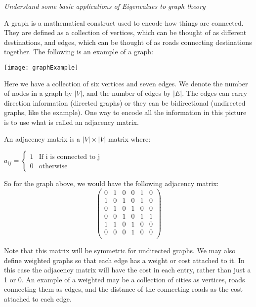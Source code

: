 \documentclass{newsiambook}
\newcommand{\objective}[1]{\vspace{5mm}{\bf Lesson Objective: } \emph{#1} \setcounter{problem}{0} \setcounter{equation}{0} \vspace{5mm}}
\begin{document}
\objective{Understand some basic applications of Eigenvalues to graph theory}

A graph is a mathematical construct used to encode how things are connected.  They are defined as a collection of vertices, which can be thought of as different destinations, and edges, which can be thought of as roads connecting destinations together.  The following is an example of a graph:

\begin{center}
\texttt{[image: graphExample]}
\end{center}

Here we have a collection of six vertices and seven edges.  We denote the number of nodes in a graph by $|V|$, and the number of edges by $|E|$.  The edges can carry direction information (directed graphs) or they can be bidirectional (undirected graphs, like the example).  One way to encode all the information in this picture is to use what is called an adjacency matrix.

\begin{definition} An adjacency matrix is a $|V| \times |V|$ matrix where:
\begin{center}
	$a_{ij} = \begin{cases} 1 & \mbox{If i is connected to j} \\ 0 & \mbox{otherwise} \end{cases}$
\end{center}

\end{definition}

So for the graph above, we would have the following adjacency matrix:
\[
\begin{pmatrix}
0 & 1 & 0 & 0 & 1 & 0 \\
1 & 0 & 1 & 0 & 1 & 0 \\
0 & 1 & 0 & 1 & 0 & 0 \\
0 & 0 & 1 & 0 & 1 & 1 \\
1 & 1 & 0 & 1 & 0 & 0 \\
0 & 0 & 0 & 1 & 0 & 0 \\
\end{pmatrix}
\]

Note that this matrix will be symmetric for undirected graphs.  We may also define weighted graphs so that each edge has a weight or cost attached to it.  In this case the adjacency matrix will have the cost in each entry, rather than just a 1 or 0.  An example of a weighted may be a collection of cities as vertices, roads connecting them as edges, and the distance of the connecting roads as the cost attached to each edge.
\end{document}
